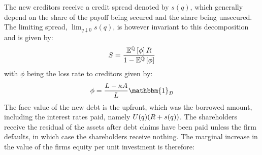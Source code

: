 \documentclass[../main.tex]{subfiles}
\begin{document}
        The new creditors receive a credit spread denoted by $s(q)$,
        which generally depend on the share of the payoff being secured and the share being unsecured.
        The limiting spread, $\lim_{q\downarrow0}s(q)$,
        is however invariant to this decomposition and is given by:
            \begin{equation}
                S = \frac{
                    \mathbb{E}^{\mathbb{Q}}\left[\phi\right] 
                    R
                }{
                    1 - \mathbb{E}^{\mathbb{Q}}\left[\phi\right]
                }
                \label{eqn:limiting-credit-spread}
            \end{equation}
        with $\phi$ being the loss rate to creditors given by:
            \begin{equation}
                \phi = \frac{
                        L - \kappa A
                    }{
                        L
                    } 
                \mathbbm{1}_{\mathcal{D}}
                \label{eqn:creditor-loss-rate}
            \end{equation}
        The face value of the new debt is the upfront, which was the borrowed amount, 
        including the interest rates paid, namely 
        $U(q)(R + s(q))$. 
        The shareholders receive the residual of the assets after debt claims have been paid
        unless the firm defaults, in which case the shareholders receive nothing. 
        The marginal increase in the value of the firms equity per unit investment is therefore:
\end{document}
